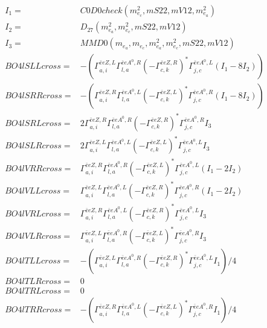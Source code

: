\documentclass[A4,landscape]{article}
\begin{document}
\begin{align} 
I_1 = & C0D0check(m^2_{e_{{c}}}, mS22, mV12, m^2_{e_{{a}}}) \\ 
I_2 = & D_{27}(m^2_{e_{{a}}}, m^2_{e_{{c}}}, mS22, mV12) \\ 
I_3 = & MMD0(m_{e_{{a}}}, m_{e_{{c}}}, m^2_{e_{{a}}}, m^2_{e_{{c}}}, mS22, mV12) \\ 
  BO4lSLLcross= & -( \Gamma^{\bar{e}e Z ,L}_{a, i} \Gamma^{\bar{e}e A^0 ,R}_{l, a} (- \Gamma^{\bar{e}e Z ,R} _{c, k})^* \Gamma^{\bar{e}e A^0 ,L}_{j, c} (I_1 - 8 I_2)) \\ 
  BO4lSRRcross= & -( \Gamma^{\bar{e}e Z ,R}_{a, i} \Gamma^{\bar{e}e A^0 ,L}_{l, a} (- \Gamma^{\bar{e}e Z ,L} _{c, k})^* \Gamma^{\bar{e}e A^0 ,R}_{j, c} (I_1 - 8 I_2)) \\ 
  BO4lSRLcross= & 2  \Gamma^{\bar{e}e Z ,R}_{a, i} \Gamma^{\bar{e}e A^0 ,R}_{l, a} (- \Gamma^{\bar{e}e Z ,R} _{c, k})^* \Gamma^{\bar{e}e A^0 ,R}_{j, c} I_3 \\ 
  BO4lSLRcross= & 2  \Gamma^{\bar{e}e Z ,L}_{a, i} \Gamma^{\bar{e}e A^0 ,L}_{l, a} (- \Gamma^{\bar{e}e Z ,L} _{c, k})^* \Gamma^{\bar{e}e A^0 ,L}_{j, c} I_3 \\ 
  BO4lVRRcross= &  \Gamma^{\bar{e}e Z ,R}_{a, i} \Gamma^{\bar{e}e A^0 ,R}_{l, a} (- \Gamma^{\bar{e}e Z ,L} _{c, k})^* \Gamma^{\bar{e}e A^0 ,L}_{j, c} (I_1 - 2 I_2) \\ 
  BO4lVLLcross= &  \Gamma^{\bar{e}e Z ,L}_{a, i} \Gamma^{\bar{e}e A^0 ,L}_{l, a} (- \Gamma^{\bar{e}e Z ,R} _{c, k})^* \Gamma^{\bar{e}e A^0 ,R}_{j, c} (I_1 - 2 I_2) \\ 
  BO4lVRLcross= &  \Gamma^{\bar{e}e Z ,R}_{a, i} \Gamma^{\bar{e}e A^0 ,L}_{l, a} (- \Gamma^{\bar{e}e Z ,R} _{c, k})^* \Gamma^{\bar{e}e A^0 ,L}_{j, c} I_3 \\ 
  BO4lVLRcross= &  \Gamma^{\bar{e}e Z ,L}_{a, i} \Gamma^{\bar{e}e A^0 ,R}_{l, a} (- \Gamma^{\bar{e}e Z ,L} _{c, k})^* \Gamma^{\bar{e}e A^0 ,R}_{j, c} I_3 \\ 
  BO4lTLLcross= & -( \Gamma^{\bar{e}e Z ,L}_{a, i} \Gamma^{\bar{e}e A^0 ,R}_{l, a} (- \Gamma^{\bar{e}e Z ,R} _{c, k})^* \Gamma^{\bar{e}e A^0 ,L}_{j, c} I_1)/4 \\ 
  BO4lTLRcross= & 0 \\ 
  BO4lTRLcross= & 0 \\ 
  BO4lTRRcross= & -( \Gamma^{\bar{e}e Z ,R}_{a, i} \Gamma^{\bar{e}e A^0 ,L}_{l, a} (- \Gamma^{\bar{e}e Z ,L} _{c, k})^* \Gamma^{\bar{e}e A^0 ,R}_{j, c} I_1)/4 \\ 
\end{align} 
\end{document}
